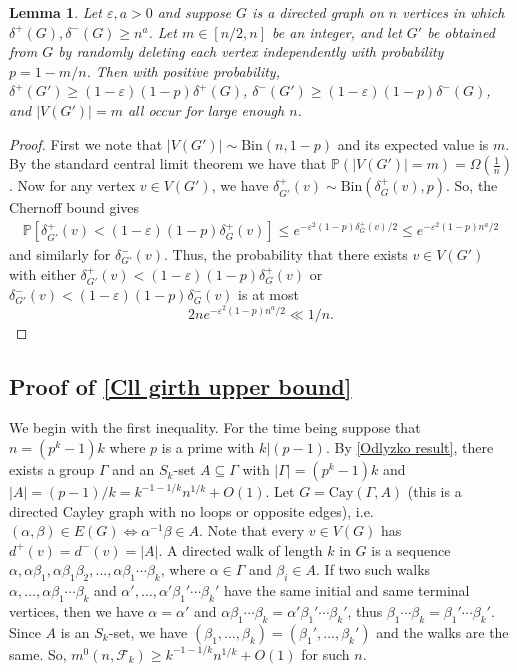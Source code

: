 \documentclass[12pt]{article}
\newtheorem{lemma}{Lemma}
\begin{document}
\begin{lemma} \label{density lemma}
Let $\varepsilon,a>0$ and suppose $G$ is a directed graph on $n$ vertices in which $\delta^+(G),\delta^-(G)\ge n^a$. Let $m\in[n/2,n]$ be an integer, and let $G'$ be obtained from $G$ by randomly deleting each vertex independently with probability $p=1-m/n$. Then with positive probability, $\delta^+(G')\ge(1-\varepsilon)(1-p)\delta^+(G)$, $\delta^-(G')\ge (1-\varepsilon)(1-p)\delta^-(G)$, and $|V(G')|=m$ all occur for large enough $n$.
\end{lemma}
\begin{proof}
    First we note that $|V(G')|\sim\mathrm{Bin}(n,1-p)$ and its expected value is $m$. By the standard central limit theorem we have that $\mathbb{P}(|V(G')| =m) = \Omega\left( \frac{1}{n}\right)$. %
    Now for any vertex $v\in V(G')$, we have $\delta^+_{G'}(v)\sim\mathrm{Bin}(\delta^+_G(v),p)$. So, the Chernoff bound \cite{chernoff1952measure} gives
    $$\begin{aligned}
        \mathbb P[\delta^+_{G'}(v)<(1-\varepsilon)(1-p)\delta^+_G(v)]\le e^{-\varepsilon^2(1-p)\delta_G^+(v)/2}\le e^{-\varepsilon^2(1-p)n^a/2}
    \end{aligned}$$
    and similarly for $\delta_{G'}^-(v)$. Thus, the probability that there exists $v\in V(G')$ with either $\delta_{G'}^+(v)<(1-\varepsilon)(1-p)\delta_G^+(v)$ or $\delta_{G'}^-(v)<(1-\varepsilon)(1-p)\delta_{G}^-(v)$ is at most
    $$2ne^{-\varepsilon^2(1-p)n^a/2}\ll1/n.$$
\end{proof}

\subsection{Proof of \autoref{Cll girth upper bound}}
    We begin with the first inequality. For the time being suppose that $n=(p^k-1)k$ where $p$ is a prime with $k|(p-1)$. By \autoref{Odlyzko result}, there exists a group $\Gamma$ and an $S_k$-set $A\subseteq\Gamma$ with $|\Gamma|=(p^k-1)k$ and $|A|=(p-1)/k=k^{-1-1/k}n^{1/k}+O(1)$. Let $G=\mathrm{Cay}(\Gamma,A)$ (this is a directed Cayley graph with no loops or opposite edges), i.e. $(\alpha,\beta)\in E(G)\Longleftrightarrow\alpha^{-1}\beta\in A$. Note that every $v\in V(G)$ has $d^+(v)=d^-(v)=|A|$. A directed walk of length $k$ in $G$ is a sequence $\alpha,\alpha\beta_1,\alpha\beta_1\beta_2,\ldots,\alpha\beta_1\cdots\beta_k$, where $\alpha\in\Gamma$ and $\beta_i\in A$. If two such walks $\alpha,\ldots,\alpha\beta_1\cdots\beta_k$ and $\alpha',\ldots,\alpha'\beta_1'\cdots\beta_k'$ have the same initial and same terminal vertices, then we have $\alpha=\alpha'$ and $\alpha\beta_1\cdots\beta_k=\alpha'\beta_1'\cdots\beta_k'$, thus $\beta_1\cdots\beta_k=\beta_1'\cdots\beta_k'$. Since $A$ is an $S_k$-set, we have $(\beta_1,\ldots,\beta_k)=(\beta_1',\ldots,\beta_k')$ and the walks are the same. So, $m^0(n,\mathcal F_k)\ge k^{-1-1/k}n^{1/k}+O(1)$ for such $n$. 
   
\end{document}
